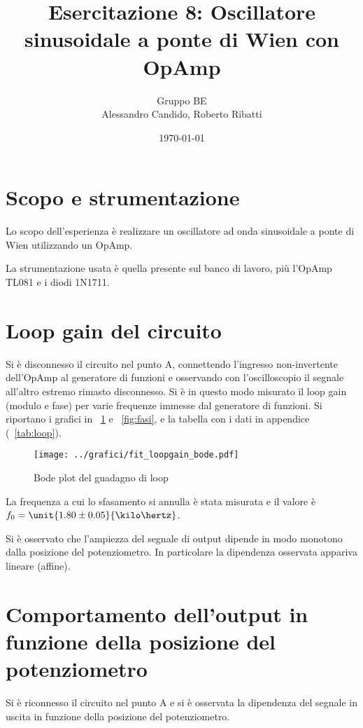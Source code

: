 \documentclass[10pt,a4paper]{article}
\title{Esercitazione 8: Oscillatore sinusoidale a ponte di Wien con OpAmp}
\author{Gruppo BE \\ Alessandro Candido, Roberto Ribatti}
\date{\today}
\begin{document}
\maketitle

\section{Scopo e strumentazione}
Lo scopo dell'esperienza è realizzare un oscillatore ad onda sinusoidale a ponte di Wien utilizzando un OpAmp.

La strumentazione usata è quella presente sul banco di lavoro, più l'OpAmp TL081 e i diodi 1N1711.

\section{Loop gain del circuito}
Si è disconnesso il circuito nel punto A, connettendo l'ingresso non-invertente dell'OpAmp al generatore di funzioni e osservando con l'oscilloscopio il segnale all'altro estremo rimasto disconnesso.
Si è in questo modo misurato il loop gain (modulo e fase) per varie frequenze immesse dal generatore di funzioni. Si riportano i grafici in \figurename{~\ref{fig:Bode}} e \figurename{~\ref{fig:fasi}}, e la tabella con i dati in appendice (\tablename{~\ref{tab:loop}}).

\begin{figure}[H]
	\begin{minipage}{\textwidth}
		\centering
		\texttt{[image: ../grafici/fit\_loopgain\_bode.pdf]}
		\caption{Bode plot del guadagno di loop}
		\label{fig:Bode}
	\end{minipage}
\end{figure}

La frequenza a cui lo sfasamento si annulla è stata misurata e il valore è $f_0 = \unit{1.80 \pm 0.05}{\kilo\hertz}$.

Si è osservato che l'ampiezza del segnale di output dipende in modo monotono dalla posizione del potenziometro. In particolare la dipendenza osservata appariva lineare (affine). 

\section{Comportamento dell'output in funzione della posizione del potenziometro}
Si è riconnesso il circuito nel punto A e si è osservata la dipendenza del segnale in uscita in funzione della posizione del potenziometro.
\end{document}
